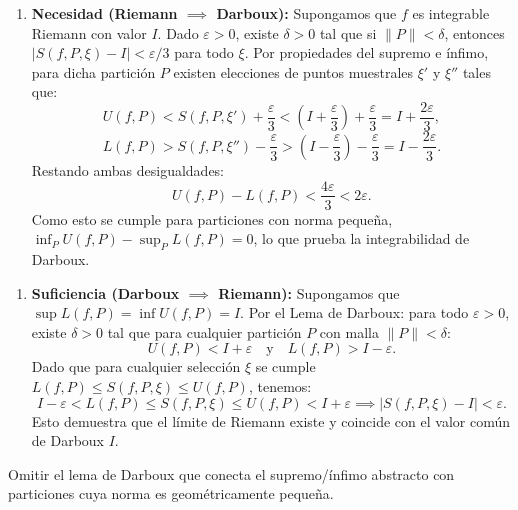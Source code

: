 \documentclass[11pt,a4paper]{article}
\begin{document}
\begin{enumerate}[label=\textbf{\arabic*.}]
\item \textbf{Necesidad (Riemann $\implies$ Darboux):}
Supongamos que $f$ es integrable Riemann con valor $I$.
Dado $\varepsilon > 0$, existe $\delta > 0$ tal que si $\|P\| < \delta$, entonces $|S(f, P, \xi) - I| < \varepsilon/3$ para todo $\xi$.
Por propiedades del supremo e ínfimo, para dicha partición $P$ existen elecciones de puntos muestrales $\xi'$ y $\xi''$ tales que:
\begin{equation*}
U(f, P) < S(f, P, \xi') + \frac{\varepsilon}{3} < (I + \frac{\varepsilon}{3}) + \frac{\varepsilon}{3} = I + \frac{2\varepsilon}{3},
\end{equation*}
\begin{equation*}
L(f, P) > S(f, P, \xi'') - \frac{\varepsilon}{3} > (I - \frac{\varepsilon}{3}) - \frac{\varepsilon}{3} = I - \frac{2\varepsilon}{3}.
\end{equation*}
Restando ambas desigualdades:
\begin{equation*}
U(f, P) - L(f, P) < \frac{4\varepsilon}{3} < 2\varepsilon.
\end{equation*}
Como esto se cumple para particiones con norma pequeña, $\inf_P U(f,P) - \sup_P L(f,P) = 0$, lo que prueba la integrabilidad de Darboux.
\end{enumerate}

\begin{enumerate}[label=\textbf{\arabic*.}]
\item \textbf{Suficiencia (Darboux $\implies$ Riemann):}
Supongamos que $\sup L(f,P) = \inf U(f,P) = I$.
Por el Lema de Darboux: para todo $\varepsilon > 0$, existe $\delta > 0$ tal que para cualquier partición $P$ con malla $\|P\| < \delta$:
\begin{equation*}
U(f, P) < I + \varepsilon \quad \text{y} \quad L(f, P) > I - \varepsilon.
\end{equation*}
Dado que para cualquier selección $\xi$ se cumple $L(f, P) \le S(f, P, \xi) \le U(f, P)$, tenemos:
\begin{equation*}
I - \varepsilon < L(f, P) \le S(f, P, \xi) \le U(f, P) < I + \varepsilon \implies |S(f, P, \xi) - I| < \varepsilon.
\end{equation*}
Esto demuestra que el límite de Riemann existe y coincide con el valor común de Darboux $I$.
\end{enumerate}

\begin{trapbox}
Omitir el lema de Darboux que conecta el supremo/ínfimo abstracto con particiones cuya norma es geométricamente pequeña.
\end{trapbox}
\end{document}
